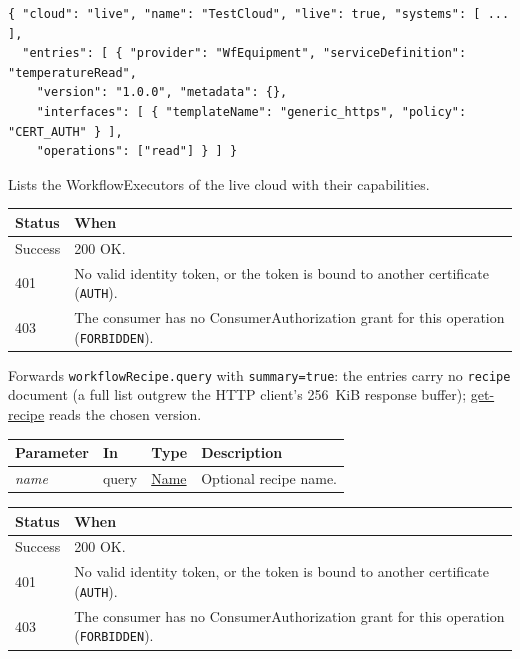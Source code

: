 \documentclass[a4paper]{arrowhead}
\newcommand{\fparam}[1]{\textit{\textcolor{ArrowheadBlue}{#1}}}
\newcommand{\oref}[1]{{\textcolor{ArrowheadBlue}{\hyperref[sec:operations:#1]{#1}}}}
\newcommand{\pref}[1]{{\textcolor{ArrowheadGrey}{\hyperref[sec:model:primitives:#1]{#1}}}}
\begin{document}
\begin{lstlisting}[caption={Example response body}]
{ "cloud": "live", "name": "TestCloud", "live": true, "systems": [ ... ],
  "entries": [ { "provider": "WfEquipment", "serviceDefinition": "temperatureRead",
    "version": "1.0.0", "metadata": {},
    "interfaces": [ { "templateName": "generic_https", "policy": "CERT_AUTH" } ],
    "operations": ["read"] } ] }
\end{lstlisting}

Lists the WorkflowExecutors of the live cloud with their capabilities.

{\small
\begin{longtable}{|p{2.0cm}|p{13.8cm}|}

\hline
\rowcolor{gray!33} Status & When \\ \hline
\endhead
Success & 200 OK. \\ \hline
401 & No valid identity token, or the token is bound to another certificate (\texttt{AUTH}). \\ \hline
403 & The consumer has no ConsumerAuthorization grant for this operation (\texttt{FORBIDDEN}). \\ \hline
\end{longtable}
}

Forwards \texttt{workflow\allowbreak{}Recipe.\allowbreak{}query} with \texttt{summary=true}: the entries carry no \texttt{recipe} document (a full list outgrew the HTTP client's 256~KiB response buffer); \oref{get-recipe} reads the chosen version.

{\small
\begin{longtable}{|p{3.0cm}|p{1.4cm}|p{3.2cm}|p{8.2cm}|}

\hline
\rowcolor{gray!33} Parameter & In & Type & Description \\ \hline
\endhead
\fparam{name} & query & \pref{Name} & Optional recipe name. \\ \hline
\end{longtable}
}


{\small
\begin{longtable}{|p{2.0cm}|p{13.8cm}|}

\hline
\rowcolor{gray!33} Status & When \\ \hline
\endhead
Success & 200 OK. \\ \hline
401 & No valid identity token, or the token is bound to another certificate (\texttt{AUTH}). \\ \hline
403 & The consumer has no ConsumerAuthorization grant for this operation (\texttt{FORBIDDEN}). \\ \hline
\end{longtable}
}
\end{document}
